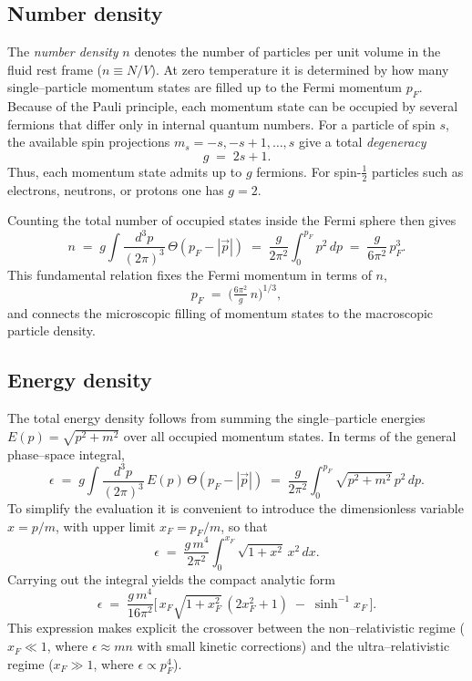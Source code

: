 \subsection*{Number density}
The \emph{number density} $n$ denotes the number of particles per unit volume in the fluid
rest frame ($n \equiv N/V$). At zero temperature it is determined by how many
single--particle momentum states are filled up to the Fermi momentum $p_F$.
Because of the Pauli principle, each momentum state can be occupied by several fermions
that differ only in internal quantum numbers. For a particle of spin $s$, the available spin
projections $m_s=-s,-s+1,\dots,s$ give a total \emph{degeneracy}
\begin{equation}
g \;=\; 2s+1.
\end{equation}
Thus, each momentum state admits up to $g$ fermions. For spin-$\tfrac12$ particles
such as electrons, neutrons, or protons one has $g=2$.

Counting the total number of occupied states inside the Fermi sphere then gives
\begin{equation}
n \;=\; g \int \frac{d^3p}{(2\pi)^3}\,\Theta(p_F-|\vec p|)
\;=\; \frac{g}{2\pi^2}\int_0^{p_F}p^2\,dp
\;=\; \frac{g}{6\pi^2}\,p_F^{3}.
\label{eq:fermi_number_density}
\end{equation}
This fundamental relation fixes the Fermi momentum in terms of $n$,
\begin{equation}
p_F \;=\; \Big(\tfrac{6\pi^2}{g}\,n\Big)^{1/3},
\label{eq:pF_of_n}
\end{equation}
and connects the microscopic filling of momentum states to the macroscopic particle density.

\subsection*{Energy density}
The total energy density follows from summing the single--particle energies $E(p)=\sqrt{p^2+m^2}$ 
over all occupied momentum states. In terms of the general phase--space integral,
\begin{equation}
\epsilon \;=\; g \int \frac{d^3p}{(2\pi)^3}\,E(p)\,\Theta(p_F-|\vec p|)
\;=\; \frac{g}{2\pi^2}\int_0^{p_F}\sqrt{p^2+m^2}\,p^2\,dp.
\label{eq:energy_density_integral}
\end{equation}
To simplify the evaluation it is convenient to introduce the dimensionless variable $x=p/m$, 
with upper limit $x_F=p_F/m$, so that
\begin{equation}
\epsilon \;=\; \frac{g\,m^4}{2\pi^2}\int_0^{x_F}\!\sqrt{1+x^2}\,x^2\,dx.
\end{equation}
Carrying out the integral yields the compact analytic form
\begin{equation}
\epsilon \;=\; \frac{g\,m^4}{16\pi^2}
\Big[\,x_F\sqrt{1+x_F^2}\,(2x_F^2+1)\;-\;\sinh^{-1}x_F\,\Big].
\label{eq:energy_density}
\end{equation}
This expression makes explicit the crossover between the non--relativistic regime 
($x_F\ll 1$, where $\epsilon \approx m n$ with small kinetic corrections) 
and the ultra--relativistic regime ($x_F\gg 1$, where $\epsilon \propto p_F^4$).

